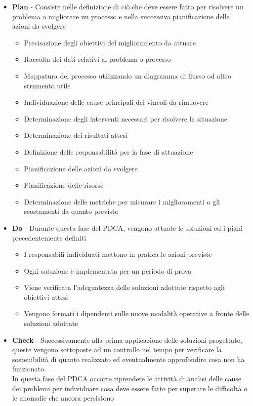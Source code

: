 {\begin{itemize}
  \item  \textbf{Plan} - Consiste nelle definizione di ciò che deve essere fatto per risolvere un problema o migliorare un processo e nella successiva pianificazione delle azioni da svolgere\\
  \begin{itemize}
    \item Precisazione degli obiettivi del miglioramento da attuare
    \item Raccolta dei dati relativi al problema o processo
    \item Mappatura del processo utilizzando un diagramma di flusso od altro strumento utile
    \item Individuazione delle cause principali dei vincoli da rimuovere
    \item Determinazione degli interventi necessari per risolvere la situazione
    \item Determinazione dei risultati attesi
    \item Definizione delle responsabilità per la fase di attuazione
    \item Pianificazione delle azioni da svolgere
    \item Pianificazione delle risorse
    \item Determinazione delle metriche per misurare i miglioramenti o gli scostamenti da quanto previsto
  \end{itemize}

  \item  \textbf{Do} - Durante questa fase del PDCA, vengono attuate le soluzioni ed i piani precedentemente definiti
  \begin{itemize}
    \item I responsabili individuati mettono in pratica le azioni previste
    \item Ogni soluzione è implementata per un periodo di prova
    \item Viene verificata l’adeguatezza delle soluzioni adottate rispetto agli obiettivi attesi
    \item Vengono formati i dipendenti sulle nuove modalità operative a fronte delle soluzioni adottate
  \end{itemize}
  
  \item  \textbf{Check} - Successivamente alla prima applicazione delle soluzioni progettate, queste vengono sottoposte ad un controllo nel tempo per verificare la sostenibilità di quanto realizzato ed eventualmente approfondire cosa non ha funzionato.\\
  In questa fase del PDCA occorre riprendere le attività di analisi delle cause dei problemi per individuare cosa deve essere fatto per superare le difficoltà o le anomalie che ancora persistono
  

\end{itemize}}
